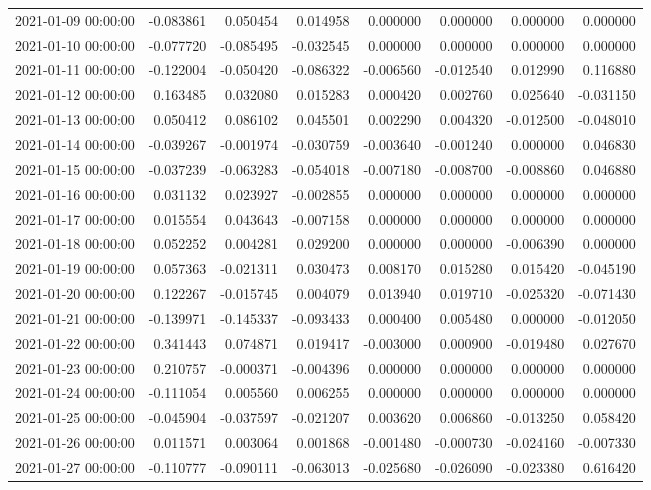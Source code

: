 \begin{tabular}{lrrrrrrr}
2021-01-09 00:00:00 & -0.083861 & 0.050454 & 0.014958 & 0.000000 & 0.000000 & 0.000000 & 0.000000 \\
2021-01-10 00:00:00 & -0.077720 & -0.085495 & -0.032545 & 0.000000 & 0.000000 & 0.000000 & 0.000000 \\
2021-01-11 00:00:00 & -0.122004 & -0.050420 & -0.086322 & -0.006560 & -0.012540 & 0.012990 & 0.116880 \\
2021-01-12 00:00:00 & 0.163485 & 0.032080 & 0.015283 & 0.000420 & 0.002760 & 0.025640 & -0.031150 \\
2021-01-13 00:00:00 & 0.050412 & 0.086102 & 0.045501 & 0.002290 & 0.004320 & -0.012500 & -0.048010 \\
2021-01-14 00:00:00 & -0.039267 & -0.001974 & -0.030759 & -0.003640 & -0.001240 & 0.000000 & 0.046830 \\
2021-01-15 00:00:00 & -0.037239 & -0.063283 & -0.054018 & -0.007180 & -0.008700 & -0.008860 & 0.046880 \\
2021-01-16 00:00:00 & 0.031132 & 0.023927 & -0.002855 & 0.000000 & 0.000000 & 0.000000 & 0.000000 \\
2021-01-17 00:00:00 & 0.015554 & 0.043643 & -0.007158 & 0.000000 & 0.000000 & 0.000000 & 0.000000 \\
2021-01-18 00:00:00 & 0.052252 & 0.004281 & 0.029200 & 0.000000 & 0.000000 & -0.006390 & 0.000000 \\
2021-01-19 00:00:00 & 0.057363 & -0.021311 & 0.030473 & 0.008170 & 0.015280 & 0.015420 & -0.045190 \\
2021-01-20 00:00:00 & 0.122267 & -0.015745 & 0.004079 & 0.013940 & 0.019710 & -0.025320 & -0.071430 \\
2021-01-21 00:00:00 & -0.139971 & -0.145337 & -0.093433 & 0.000400 & 0.005480 & 0.000000 & -0.012050 \\
2021-01-22 00:00:00 & 0.341443 & 0.074871 & 0.019417 & -0.003000 & 0.000900 & -0.019480 & 0.027670 \\
2021-01-23 00:00:00 & 0.210757 & -0.000371 & -0.004396 & 0.000000 & 0.000000 & 0.000000 & 0.000000 \\
2021-01-24 00:00:00 & -0.111054 & 0.005560 & 0.006255 & 0.000000 & 0.000000 & 0.000000 & 0.000000 \\
2021-01-25 00:00:00 & -0.045904 & -0.037597 & -0.021207 & 0.003620 & 0.006860 & -0.013250 & 0.058420 \\
2021-01-26 00:00:00 & 0.011571 & 0.003064 & 0.001868 & -0.001480 & -0.000730 & -0.024160 & -0.007330 \\
2021-01-27 00:00:00 & -0.110777 & -0.090111 & -0.063013 & -0.025680 & -0.026090 & -0.023380 & 0.616420 \\

\end{tabular}

